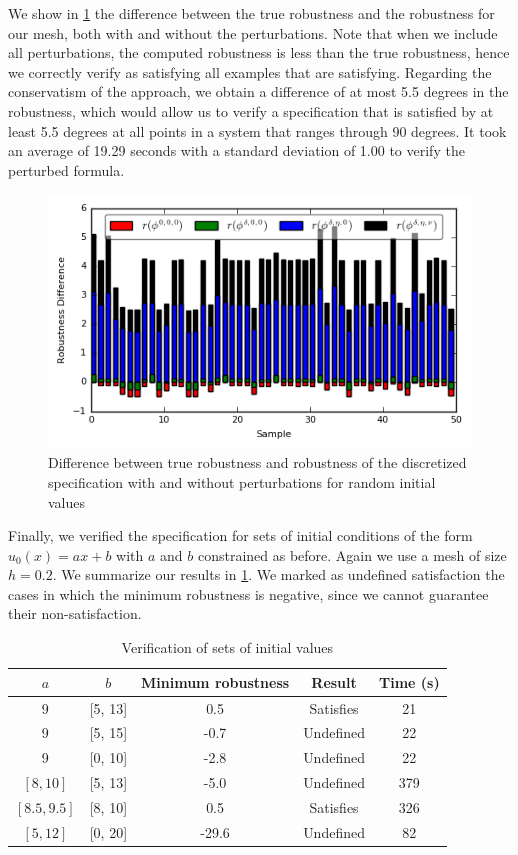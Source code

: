 \documentclass[letterpaper, 10 pt, conference]{ieeeconf/ieeeconf}
\begin{document}
We show in \cref{fig:res_diffs} the difference between the true robustness and
the robustness for our mesh, both with and without the perturbations. Note that
when we include all perturbations, the computed robustness is less than the true
robustness, hence we correctly verify as satisfying all examples
that are satisfying. Regarding the conservatism of the approach, we obtain a
difference of at most 5.5 degrees in the robustness, which would allow us to verify a
specification that is satisfied by at least 5.5 degrees at all points in a system
that ranges through 90 degrees. It took an average of 19.29 seconds with a
standard deviation of 1.00 to verify the perturbed formula.

\begin{figure}
    \centering
    \includegraphics[width=0.8\linewidth]{figures/cs_ran_init_results.png}
    \caption{Difference between true robustness and robustness of the
        discretized specification with and without perturbations for
        random initial values}
    \label{fig:res_diffs}
\end{figure}


Finally, we verified the specification for sets of initial conditions of the
form $u_0(x) = a x + b$ with $a$ and $b$ constrained as before. Again we use a
mesh of size $h = 0.2$. We summarize our results in \cref{tab:res_sets}. We
marked as undefined satisfaction the cases in which the minimum robustness is
negative, since we cannot guarantee their non-satisfaction.

\begin{table}
\caption{Verification of sets of initial values}
\label{tab:res_sets}
\centering
\begin{tabular}{|c|c|c|c|c|}
    \hline
    $a$ & $b$ & Minimum robustness & Result & Time (s)  \\
    \hline
    9 & [5, 13] & 0.5 & Satisfies & 21 \\
    9 & [5, 15] & -0.7 & Undefined & 22 \\
    9 & [0, 10] & -2.8 & Undefined & 22 \\
    $[8, 10]$ & [5, 13] & -5.0 & Undefined & 379 \\
    $[8.5, 9.5]$ & [8, 10] & 0.5 & Satisfies & 326 \\
    $[5, 12]$ & [0, 20] & -29.6 & Undefined & 82 \\
    \hline
\end{tabular}
\end{table}
\end{document}
